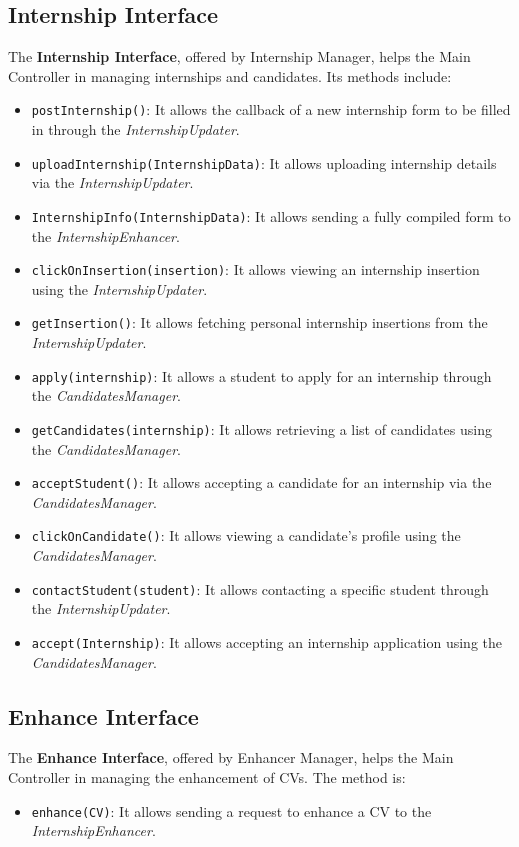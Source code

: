 \subsection{Internship Interface}
The \textbf{Internship Interface}, offered by Internship Manager, helps the Main Controller in managing internships and candidates. Its methods include:
\begin{itemize}
    \item \texttt{postInternship()}: It allows the callback of a new internship form to be filled in through the \textit{InternshipUpdater}.
    \item \texttt{uploadInternship(InternshipData)}: It allows uploading internship details via the \textit{InternshipUpdater}.
    \item \texttt{InternshipInfo(InternshipData)}: It allows sending a fully compiled form to the \textit{InternshipEnhancer}.
    \item \texttt{clickOnInsertion(insertion)}: It allows viewing an internship insertion using the \textit{InternshipUpdater}.
    \item \texttt{getInsertion()}: It allows fetching personal internship insertions from the \textit{InternshipUpdater}.
    \item \texttt{apply(internship)}: It allows a student to apply for an internship through the \textit{CandidatesManager}.
    \item \texttt{getCandidates(internship)}: It allows retrieving a list of candidates using the \textit{CandidatesManager}.
    \item \texttt{acceptStudent()}: It allows accepting a candidate for an internship via the \textit{CandidatesManager}.
    \item \texttt{clickOnCandidate()}: It allows viewing a candidate’s profile using the \textit{CandidatesManager}.
    \item \texttt{contactStudent(student)}: It allows contacting a specific student through the \textit{InternshipUpdater}.
    \item \texttt{accept(Internship)}: It allows accepting an internship application using the \textit{CandidatesManager}.
\end{itemize}

\subsection{Enhance Interface}
The \textbf{Enhance Interface}, offered by Enhancer Manager, helps the Main Controller in  managing the enhancement of CVs. The method is:
\begin{itemize}
    \item \texttt{enhance(CV)}: It allows sending a request to enhance a CV to the \textit{InternshipEnhancer}.
\end{itemize}

